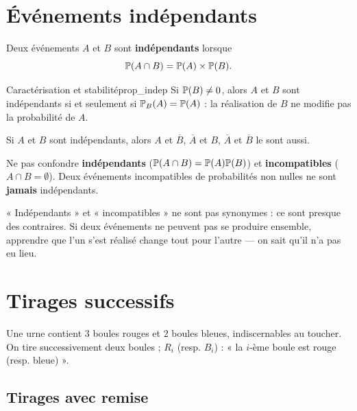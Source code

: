 \section{Événements indépendants}

\begin{definition}
	Deux événements $A$ et $B$ sont \textbf{indépendants} lorsque
	\[
	\mathbb{P}(A\cap B) = \mathbb{P}(A)\times\mathbb{P}(B).
	\]
\end{definition}

\begin{propriete}{Caractérisation et stabilité}{prop_indep}
	Si $\mathbb{P}(B)\neq0$, alors $A$ et $B$ sont indépendants si et seulement si
	$\mathbb{P}_B(A) = \mathbb{P}(A)$ : la réalisation de $B$ ne modifie pas la
	probabilité de $A$.

	Si $A$ et $B$ sont indépendants, alors $A$ et $\overline{B}$,
	$\overline{A}$ et $B$, $\overline{A}$ et $\overline{B}$ le sont aussi.
\end{propriete}

\begin{attention}
	Ne pas confondre \textbf{indépendants}
	($\mathbb{P}(A\cap B)=\mathbb{P}(A)\mathbb{P}(B)$) et \textbf{incompatibles}
	($A\cap B=\emptyset$). Deux événements incompatibles de probabilités non
	nulles ne sont \textbf{jamais} indépendants.
\end{attention}

\begin{clindoeil}
	« Indépendants » et « incompatibles » ne sont pas synonymes : ce sont
	presque des contraires. Si deux événements ne peuvent pas se produire
	ensemble, apprendre que l'un s'est réalisé change tout pour l'autre --- on
	sait qu'il n'a pas eu lieu.
\end{clindoeil}


\section{Tirages successifs}

Une urne contient $3$ boules rouges et $2$ boules bleues, indiscernables au
toucher. On tire successivement deux boules ; $R_i$ (resp. $B_i$) : « la
$i$-ème boule est rouge (resp. bleue) ».

\subsection{Tirages avec remise}


